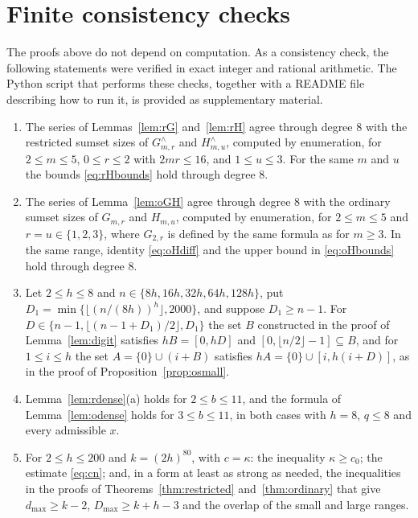 \documentclass[11pt]{amsart}
\theoremstyle{definition}
\theoremstyle{remark}
\numberwithin{equation}{section}
\begin{document}
\section{Finite consistency checks}\label{sec:checks}

The proofs above do not depend on computation. As a consistency check, the following statements were verified in exact integer and rational arithmetic. The Python script that performs these checks, together with a README file describing how to run it, is provided as supplementary material.
\begin{enumerate}[label=\textup{(\arabic*)},leftmargin=2em]
\item The series of Lemmas~\ref{lem:rG} and~\ref{lem:rH} agree through degree $8$ with the restricted sumset sizes of $G^\wedge_{m,r}$ and $H^\wedge_{m,u}$, computed by enumeration, for $2\le m\le 5$, $0\le r\le 2$ with $2mr\le 16$, and $1\le u\le 3$. For the same $m$ and $u$ the bounds \eqref{eq:rHbounds} hold through degree $8$.
\item The series of Lemma~\ref{lem:oGH} agree through degree $8$ with the ordinary sumset sizes of $G_{m,r}$ and $H_{m,u}$, computed by enumeration, for $2\le m\le 5$ and $r=u\in\{1,2,3\}$, where $G_{2,r}$ is defined by the same formula as for $m\ge 3$. In the same range, identity \eqref{eq:oHdiff} and the upper bound in \eqref{eq:oHbounds} hold through degree $8$.
\item Let $2\le h\le 8$ and $n\in\{8h,16h,32h,64h,128h\}$, put $D_1=\min\{\lfloor(n/(8h))^h\rfloor,2000\}$, and suppose $D_1\ge n-1$. For $D\in\{n-1,\lfloor(n-1+D_1)/2\rfloor,D_1\}$ the set $B$ constructed in the proof of Lemma~\ref{lem:digit} satisfies $hB=[0,hD]$ and $[0,\lfloor n/2\rfloor-1]\subseteq B$, and for $1\le i\le h$ the set $A=\{0\}\cup(i+B)$ satisfies $hA=\{0\}\cup[i,h(i+D)]$, as in the proof of Proposition~\ref{prop:osmall}.
\item Lemma~\ref{lem:rdense}(a) holds for $2\le b\le 11$, and the formula of Lemma~\ref{lem:odense} holds for $3\le b\le 11$, in both cases with $h=8$, $q\le 8$ and every admissible $x$.
\item For $2\le h\le 200$ and $k=(2h)^{80}$, with $c=\kappa$: the inequality $\kappa\ge c_0$; the estimate \eqref{eq:cn}; and, in a form at least as strong as needed, the inequalities in the proofs of Theorems~\ref{thm:restricted} and~\ref{thm:ordinary} that give $d_{\max}\ge k-2$, $D_{\max}\ge k+h-3$ and the overlap of the small and large ranges.
\end{enumerate}
\end{document}

